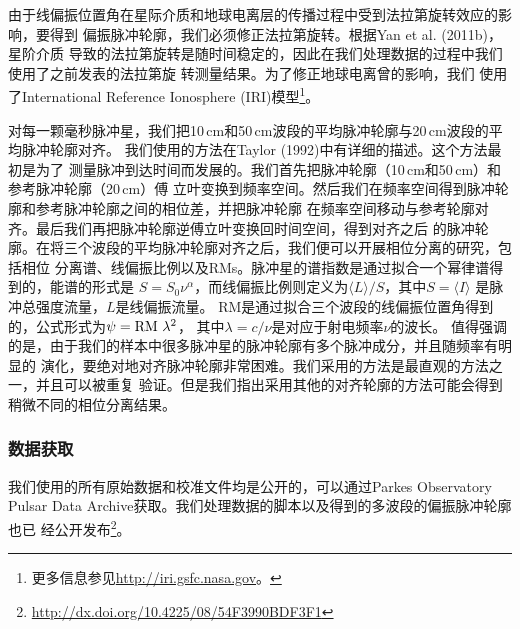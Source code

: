由于线偏振位置角在星际介质和地球电离层的传播过程中受到法拉第旋转效应的影响，要得到
偏振脉冲轮廓，我们必须修正法拉第旋转。根据Yan et al. (2011b)\supercite{Yan11b}，星阶介质
导致的法拉第旋转是随时间稳定的，因此在我们处理数据的过程中我们使用了之前发表的法拉第旋
转测量结果\supercite{Keith11,Yan11b,Keith12,Burgay13}。为了修正地球电离曾的影响，我们
使用了International Reference Ionosphere (IRI)模型\footnote{更多信息参见\url{http://iri.gsfc.nasa.gov}。}。 

对每一颗毫秒脉冲星，我们把10\,cm和50\,cm波段的平均脉冲轮廓与20\,cm波段的平均脉冲轮廓对齐。
我们使用的方法在Taylor (1992)\supercite{Taylor92}中有详细的描述。这个方法最初是为了
测量脉冲到达时间而发展的。我们首先把脉冲轮廓（10\,cm和50\,cm）和参考脉冲轮廓（20\,cm）傅
立叶变换到频率空间。然后我们在频率空间得到脉冲轮廓和参考脉冲轮廓之间的相位差，并把脉冲轮廓
在频率空间移动与参考轮廓对齐。最后我们再把脉冲轮廓逆傅立叶变换回时间空间，得到对齐之后
的脉冲轮廓。在将三个波段的平均脉冲轮廓对齐之后，我们便可以开展相位分离的研究，包括相位
分离谱、线偏振比例以及RMs。脉冲星的谱指数是通过拟合一个幂律谱得到的，能谱的形式是
$S=S_{0}\nu^{\alpha}$，而线偏振比例则定义为$\langle L \rangle/S$，其中$S=\langle I\rangle$
是脉冲总强度流量，$L$是线偏振流量。
%
RM是通过拟合三个波段的线偏振位置角得到的，公式形式为$\psi=\rm{RM}\ \lambda^{2}$，
其中$\lambda=c/\nu$是对应于射电频率$\nu$的波长。
%
值得强调的是，由于我们的样本中很多脉冲星的脉冲轮廓有多个脉冲成分，并且随频率有明显的
演化，要绝对地对齐脉冲轮廓非常困难。我们采用的方法是最直观的方法之一，并且可以被重复
验证。但是我们指出采用其他的对齐轮廓的方法可能会得到稍微不同的相位分离结果。

\subsubsection{数据获取}

我们使用的所有原始数据和校准文件均是公开的，可以通过Parkes Observatory Pulsar Data 
Archive\supercite{Hobbs11}获取。我们处理数据的脚本以及得到的多波段的偏振脉冲轮廓也已
经公开发布\footnote{\url{http://dx.doi.org/10.4225/08/54F3990BDF3F1}}。

